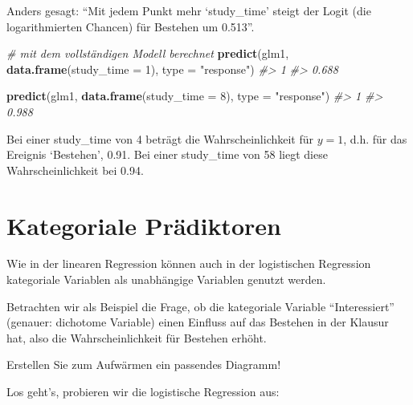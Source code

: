 \documentclass[12pt,ngerman,]{book}
\makeatletter
\newenvironment{Shaded}{\begin{snugshade}}{\end{snugshade}}
\newcommand{\KeywordTok}[1]{\textcolor[rgb]{0.13,0.29,0.53}{\textbf{#1}}}
\newcommand{\DataTypeTok}[1]{\textcolor[rgb]{0.13,0.29,0.53}{#1}}
\newcommand{\DecValTok}[1]{\textcolor[rgb]{0.00,0.00,0.81}{#1}}
\newcommand{\StringTok}[1]{\textcolor[rgb]{0.31,0.60,0.02}{#1}}
\newcommand{\CommentTok}[1]{\textcolor[rgb]{0.56,0.35,0.01}{\textit{#1}}}
\newcommand{\OperatorTok}[1]{\textcolor[rgb]{0.81,0.36,0.00}{\textbf{#1}}}
\newcommand{\NormalTok}[1]{#1}
\newenvironment{kframe}{%
\medskip{}
\setlength{\fboxsep}{.8em}
 \def\at@end@of@kframe{}%
 \ifinner\ifhmode%
  \def\at@end@of@kframe{\end{minipage}}%
  \begin{minipage}{\columnwidth}%
 \fi\fi%
 \def\FrameCommand##1{\hskip\@totalleftmargin \hskip-\fboxsep
 \colorbox{shadecolor}{##1}\hskip-\fboxsep
     \hskip-\linewidth \hskip-\@totalleftmargin \hskip\columnwidth}%
 \MakeFramed {\advance\hsize-\width
   \@totalleftmargin\z@ \linewidth\hsize
   \@setminipage}}%
 {\par\unskip\endMakeFramed%
 \at@end@of@kframe}
\renewenvironment{Shaded}{\begin{kframe}}{\end{kframe}}
\theoremstyle{definition}
\theoremstyle{definition}
\theoremstyle{remark}
\makeatother
\begin{document}
Anders gesagt: ``Mit jedem Punkt mehr `study\_time' steigt der Logit
(die logarithmierten Chancen) für Bestehen um 0.513''.

\begin{Shaded}
\begin{Highlighting}[]

\CommentTok{# mit dem vollständigen Modell berechnet}
\KeywordTok{predict}\NormalTok{(glm1, }\KeywordTok{data.frame}\NormalTok{(}\DataTypeTok{study_time =} \DecValTok{1}\NormalTok{), }
        \DataTypeTok{type =} \StringTok{"response"}\NormalTok{)}
\CommentTok{#>     1 }
\CommentTok{#> 0.688}

\KeywordTok{predict}\NormalTok{(glm1, }\KeywordTok{data.frame}\NormalTok{(}\DataTypeTok{study_time =} \DecValTok{8}\NormalTok{), }
        \DataTypeTok{type =} \StringTok{"response"}\NormalTok{)}
\CommentTok{#>     1 }
\CommentTok{#> 0.988}
\end{Highlighting}
\end{Shaded}

Bei einer study\_time von 4 beträgt die Wahrscheinlichkeit für \(y=1\),
d.h. für das Ereignis `Bestehen', 0.91. Bei einer study\_time von 58
liegt diese Wahrscheinlichkeit bei 0.94.

\section{Kategoriale Prädiktoren}\label{kategoriale-pradiktoren}

Wie in der linearen Regression können auch in der logistischen
Regression kategoriale Variablen als unabhängige Variablen genutzt
werden.

Betrachten wir als Beispiel die Frage, ob die kategoriale Variable
``Interessiert'' (genauer: dichotome Variable) einen Einfluss auf das
Bestehen in der Klausur hat, also die Wahrscheinlichkeit für Bestehen
erhöht.

\begin{Shaded}
\end{Shaded}

Erstellen Sie zum Aufwärmen ein passendes Diagramm!

Los geht's, probieren wir die logistische Regression aus:
\end{document}
